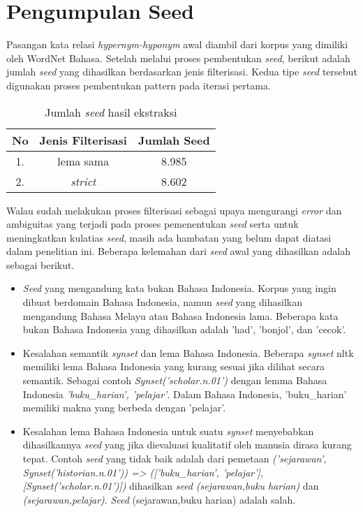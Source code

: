 \section{Pengumpulan Seed}
Pasangan kata relasi \textit{hypernym-hyponym} awal diambil dari korpus yang dimiliki oleh WordNet Bahasa. Setelah melalui proses pembentukan \textit{seed}, berikut adalah jumlah \textit{seed} yang dihasilkan berdasarkan jenis filterisasi. Kedua tipe \textit{seed} tersebut digunakan proses pembentukan pattern pada iterasi pertama. 
\begin{table}
  \centering
    \caption{Jumlah \textit{seed} hasil ekstraksi}
      \label{table:jumlahSeed}
      \begin{tabular}{|c|c|c|}
        \hline
          No & Jenis Filterisasi & Jumlah Seed \\ \hline
          1. & lema sama         & 8.985       \\ \hline
          2. & \textit{strict}   & 8.602       \\ \hline
    \end{tabular}
\end{table}

Walau sudah melakukan proses filterisasi sebagai upaya mengurangi \textit{error} dan ambiguitas yang terjadi pada proses pemenentukan \textit{seed} serta untuk meningkatkan kulatias \textit{seed}, masih ada hambatan yang belum dapat diatasi dalam penelitian ini. Beberapa kelemahan dari \textit{seed} awal yang dihasilkan adalah sebagai berikut.
\begin{itemize}
  \item \textit{Seed} yang mengandung kata bukan Bahasa Indonesia. Korpus yang ingin dibuat berdomain Bahasa Indonesia, namun \textit{seed} yang dihasilkan mengandung Bahasa Melayu atau Bahasa Indonesia lama. Beberapa kata bukan Bahasa Indonesia yang dihasilkan adalah 'had', 'bonjol', dan 'cecok'.
  \item Kesalahan semantik \textit{synset} dan lema Bahasa Indonesia. Beberapa \textit{synset} nltk memiliki lema Bahasa Indonesia yang kurang sesuai jika dilihat secara semantik. Sebagai contoh \textit{Synset('scholar.n.01')} dengan lemma Bahasa Indonesia \textit{{'buku\_harian', 'pelajar'}}. Dalam Bahasa Indonesia, 'buku\_harian' memiliki makna yang berbeda dengan 'pelajar'.
  \item Kesalahan lema Bahasa Indonesia untuk suatu \textit{synset} menyebabkan dihasilkannya \textit{seed} yang jika dievaluasi kualitatif oleh manusia dirasa kurang tepat. Contoh \textit{seed} yang tidak baik adalah dari pemetaan \textit{('sejarawan', Synset('historian.n.01')) => (['buku\_harian', 'pelajar'], [Synset('scholar.n.01')])} dihasilkan \textit{seed} \textit{(sejarawan,buku harian)} dan \textit{(sejarawan,pelajar)}. \textit{Seed} (sejarawan,buku harian) adalah salah.
\end{itemize}


